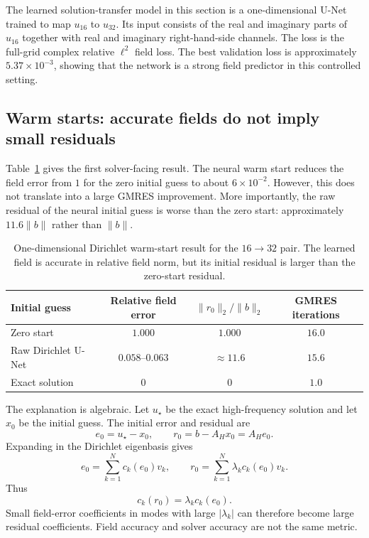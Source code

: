 The learned solution-transfer model in this section is a one-dimensional
U-Net trained to map $u_{16}$ to $u_{32}$. Its input consists of the real and
imaginary parts of $u_{16}$ together with real and imaginary right-hand-side
channels. The loss is the full-grid complex relative $\ell^2$ field loss. The
best validation loss is approximately $5.37\times 10^{-3}$, showing that the
network is a strong field predictor in this controlled setting.

\subsection{Warm starts: accurate fields do not imply small residuals}
\label{subsec:results-1d-warm-start}

Table~\ref{tab:results-1d-warm-start} gives the first solver-facing result.
The neural warm start reduces the field error from $1$ for the zero initial
guess to about $6\times 10^{-2}$. However, this does not translate into a
large GMRES improvement. More importantly, the raw residual of the neural
initial guess is worse than the zero start: approximately $11.6\|b\|$ rather
than $\|b\|$.

\begin{table}[htbp]
\centering
\caption{One-dimensional Dirichlet warm-start result for the
$16\to32$ pair. The learned field is accurate in relative field norm, but its
initial residual is larger than the zero-start residual.}
\label{tab:results-1d-warm-start}
\begin{tabular}{lccc}
\toprule
Initial guess & Relative field error & $\|r_0\|_2/\|b\|_2$ & GMRES iterations \\
\midrule
Zero start & $1.000$ & $1.000$ & $16.0$ \\
Raw Dirichlet U-Net & $0.058$--$0.063$ & $\approx 11.6$ & $15.6$ \\
Exact solution & $0$ & $0$ & $1.0$ \\
\bottomrule
\end{tabular}
\end{table}

The explanation is algebraic. Let $u_\star$ be the exact high-frequency
solution and let $x_0$ be the initial guess. The initial error and residual are
\begin{equation}
    e_0 = u_\star - x_0,
    \qquad
    r_0 = b - A_H x_0 = A_H e_0.
    \label{eq:results-error-residual}
\end{equation}
Expanding in the Dirichlet eigenbasis gives
\begin{equation}
    e_0 = \sum_{k=1}^{N} c_k(e_0)v_k,
    \qquad
    r_0 = \sum_{k=1}^{N} \lambda_k c_k(e_0)v_k.
    \label{eq:results-modal-amplification}
\end{equation}
Thus
\begin{equation}
    c_k(r_0) = \lambda_k c_k(e_0).
\end{equation}
Small field-error coefficients in modes with large $|\lambda_k|$ can therefore
become large residual coefficients. Field accuracy and solver accuracy are not
the same metric.

